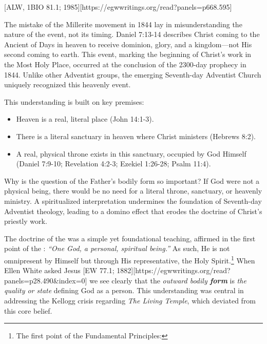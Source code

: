[ALW, 1BIO 81.1; 1985][https://egwwritings.org/read?panels=p668.595]

The mistake of the Millerite movement in 1844 lay in misunderstanding the nature of the event, not its timing. Daniel 7:13-14 describes Christ coming to the Ancient of Days in heaven to receive dominion, glory, and a kingdom—not His second coming to earth. This event, marking the beginning of Christ’s work in the Most Holy Place, occurred at the conclusion of the 2300-day prophecy in 1844. Unlike other Adventist groups, the emerging Seventh-day Adventist Church uniquely recognized this heavenly event.

This understanding is built on key premises:
\begin{itemize}
    \item Heaven is a real, literal place (John 14:1-3).
    \item There is a literal sanctuary in heaven where Christ ministers (Hebrews 8:2). 
    \item A real, physical throne exists in this sanctuary, occupied by God Himself (Daniel 7:9-10; Revelation 4:2-3; Ezekiel 1:26-28; Psalm 11:4).
\end{itemize}

Why is the question of the Father’s bodily form so important? If God were not a physical being, there would be no need for a literal throne, sanctuary, or heavenly ministry. A spiritualized interpretation undermines the foundation of Seventh-day Adventist theology, leading to a domino effect that erodes the doctrine of Christ’s priestly work.

The doctrine of the  was a simple yet foundational teaching, affirmed in the first point of the : \textit{“One God, a personal, spiritual being.”} As such, He is not omnipresent by Himself but through His representative, the Holy Spirit.\footnote{The first point of the Fundamental Principles: } When Ellen White asked Jesus [EW 77.1; 1882][https://egwwritings.org/read?panels=p28.490&index=0] we see clearly that the \textit{outward bodily \textbf{form}} is \textit{the quality or state} defining God as a person. This understanding was central in addressing the Kellogg crisis regarding \textit{The Living Temple}, which deviated from this core belief.

